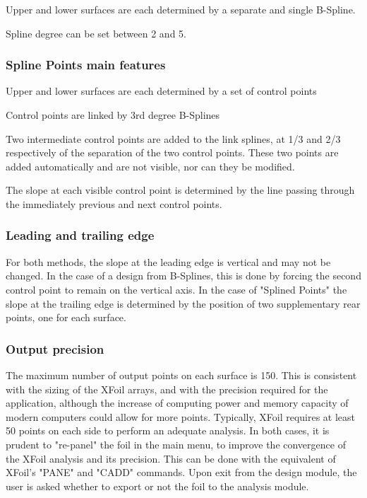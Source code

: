\documentclass[a4paper,twoside,12pt,dvips]{article}
\begin{document}
Upper and lower surfaces are each determined by a separate and single
B-Spline.

Spline degree can be set between 2 and 5.

\subsubsection{Spline Points main features}

Upper and lower surfaces are each determined by a set of control points

Control points are linked by 3rd degree B-Splines

Two intermediate control points are added to the link splines, at 1/3
and 2/3 respectively of the separation of the two control
points. These two points are added automatically and are not visible,
nor can they be modified.

The slope at each visible control point is determined by the line
passing through the immediately previous and next control points.

\subsubsection{Leading and trailing edge}

For both methods, the slope at the leading edge is vertical and may
not be changed. In the case of a design from B-Splines, this is done
by forcing the second control point to remain on the vertical axis.
\newline
In the case of "Splined Points" the slope at the trailing edge is
determined by the position of two supplementary rear points, one for
each surface.

\subsubsection{Output precision}

The maximum number of output points on each surface is 150. This is
consistent with the sizing of the XFoil arrays, and with the precision
required for the application, although the increase of computing power
and memory capacity of modern computers could allow for more points.
Typically, XFoil requires at least 50 points on each side to perform
an adequate analysis.\newline
In both cases, it is prudent to "re-panel" the foil in the main
menu, to improve the convergence of the XFoil analysis and its
precision. This can be done with the equivalent of XFoil's "PANE"
and "CADD" commands. \newline
Upon exit from the design module, the user is asked whether to export
or not the foil to the analysis module.
\end{document}
